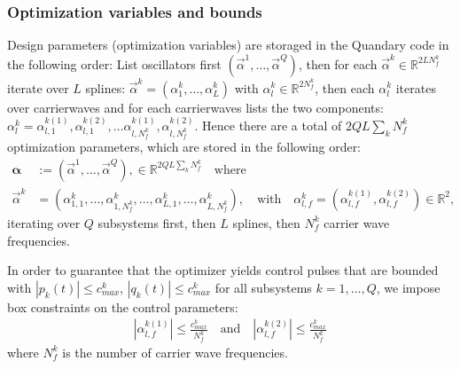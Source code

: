 \documentclass[letterpaper]{article}
\newcommand{\R}{\mathds{R}}
\begin{document}
  \subsubsection{Optimization variables and bounds}

Design parameters (optimization variables) are storaged in the Quandary code in the following order: List oscillators first $(\vec{\alpha}^1, \dots, \vec{\alpha}^Q)$, then for each $\vec{\alpha}^k \in
\R^{2LN_f^k}$ iterate over $L$ splines: $\vec{\alpha}^k =
(\alpha^k_1,\dots, \alpha^k_{L})$ with $\alpha^k_l \in \R^{2N_f^k}$, then each
$\alpha^k_l$ iterates over carrierwaves and for each carrierwaves lists
the two components: $\alpha^k_l = \alpha^{k(1)}_{l,1}, \alpha^{k(2)}_{l,1},
\dots \alpha^{k(1)}_{l,N_f^k}, \alpha^{k(2)}_{l,N_f^k}$. Hence there are a total of $2QL\sum_k N_f^k$ optimization parameters, which are stored in the following order:
  \begin{align}
    \boldsymbol{\alpha} &:= \left( \vec{\alpha}^1, \dots, \vec{\alpha}^Q \right), \in
    \mathds{R}^{2QL\sum_k N_f^k} \quad \text{where}\\
    \vec{\alpha}^k &= \left( \alpha_{1,1}^k,\dots, \alpha_{1,N_f^k}^k, \dots,
    \alpha_{L,1}^{k}, \dots, \alpha_{L,N_f^k}^k \right), \quad \text{with} \quad
    \alpha_{l,f}^k = \left(\alpha_{l,f}^{k(1)}, \alpha_{l,f}^{k(2)} \right) \in
    \R^2,
  \end{align}
  iterating over $Q$ subsystems first, then $L$ splines, then $N_f^k$ carrier wave
  frequencies. 

  In order to guarantee that the optimizer yields control pulses that are
  bounded with $|p_k(t)| \leq c^k_{max}$, $|q_k(t)| \leq c^k_{max}$ for all
  subsystems $k=1,\dots, Q$, we impose box constraints on the control
  parameters:
   \begin{align}
     | \alpha_{l,f}^{k(1)}| \leq \frac{c^k_{max}}{N_f^k} \quad \text{and} \quad |
     \alpha_{l,f}^{k(2)} | \leq \frac{c^k_{max}}{N_f^k}
   \end{align}
   where $N_f^k$ is the number of carrier wave frequencies.
\end{document}
